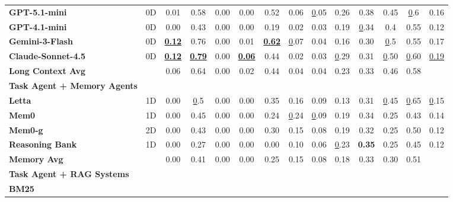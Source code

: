 \begin{table}[th]
{\begin{tabular}{@{}lccccccccccccc@{}}
\textbf{GPT-5.1-mini} &
  0D &
  0.01 &
  0.58 &
  0.00 &
  0.00 &
  0.52 &
  0.06 &
  {\ul 0.05}
   &
  0.26 &
  0.38 &
  0.45 &
  {\ul 0.6} &
  0.16 \\
\textbf{GPT-4.1-mini} &
  0D &
  0.00 &
  0.43 &
  0.00 &
  0.00 &
  0.19 &
  0.02 &
  0.03
   &
  0.19 &
  {\ul 0.34} &
  0.4 &
  0.55 &
  0.12 \\
\textbf{Gemini-3-Flash} &
  0D &
  {\ul \textbf{0.12}} &
  0.76 &
  0.00 &
  0.01 &
  {\ul \textbf{0.62}} &
  {\ul 0.07} &
  0.04
  {\ul \textbf{}} &
  0.16 &
  0.30 &
  {\ul 0.5} &
  0.55 &
  0.17 \\
\textbf{Claude-Sonnet-4.5} &
  0D &
  {\ul \textbf{0.12}} &
  {\ul \textbf{0.79}} &
  0.00 &
  {\ul \textbf{0.06}} &
  0.44 &
  0.02 &
  0.03
   &
  {\ul 0.29} &
  0.31 &
  {\ul 0.50} &
  {\ul 0.60} &
  {\ul {0.19}} \\
\rowcolor[HTML]{EFEFEF} \textbf{Long Context Avg} &
   &
  0.06 &
  0.64 &
  0.00 &
  0.02 &
  0.44 &
  0.04 &
  0.04
   &
  0.23 &
  0.33 &
  0.46 &
  0.58 &
   \\ \midrule
\rowcolor[HTML]{ECF4FF}
\textbf{Task Agent + Memory Agents} &
   &
   &
   &
   &
   &
   &
   &
   &
   &
   &
   &
   &
   \\
\textbf{Letta} &
  1D &
  0.00 &
  {\ul 0.5} &
  0.00 &
  0.00 &
  0.35 &
  0.16 &
  0.09 &
  0.13 &
  { 0.31} &
  {\ul 0.45} &
  {\ul 0.65} &
  {\ul 0.15} \\
\textbf{Mem0} &
  1D &
  0.00 &
  0.45 &
  0.00 &
  0.00 &
  0.24 &
  {\ul 0.24} &
  {\ul 0.09} &
  0.19 &
  0.34 &
  0.25 &
  0.43 &
  0.14 \\
\textbf{Mem0-g} &
  2D &
  0.00 &
  0.43 &
  0.00 &
  0.00 &
  0.30 &
  0.15 &
  0.08 &
  0.19 &
  0.32 &
  0.25 &
  0.50 &
  0.12 \\
\textbf{Reasoning Bank} &
  1D &
  0.00 &
  0.27 &
  0.00 &
  0.00 &
  0.00 &
  0.10 &
  0.06 &
  {\ul 0.23} &
  \textbf{0.35} &
  0.25 &
  0.45 &
  0.12 \\
\rowcolor[HTML]{EFEFEF}  \textbf{Memory Avg} &
   &
  0.00 &
  0.41 &
  0.00 &
  0.00 &
  0.25 &
  0.15 &
  0.08 &
  0.18 &
  0.33 &
  0.30 &
  0.51 &
   \\ \midrule
\rowcolor[HTML]{ECF4FF}
\textbf{Task Agent + RAG Systems} &
   &
   &
   &
   &
   &
   &
   &
   &
   &
   &
   &
   &
   \\
\textbf{BM25} &

\end{tabular}}
\end{table}
